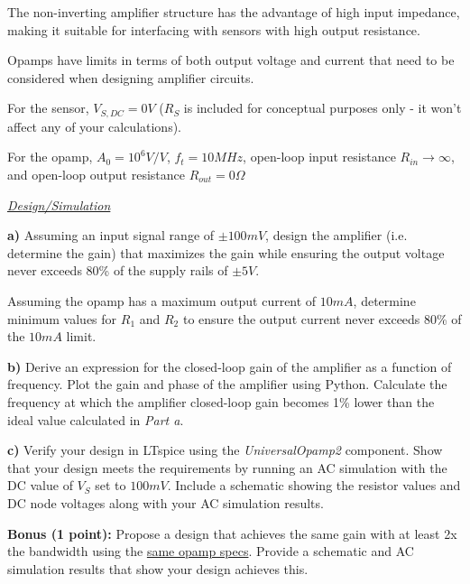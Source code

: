 \documentclass[11pt, letterpaper]{article}
\begin{document}
The non-inverting amplifier structure has the advantage of high input impedance, making it suitable for interfacing with sensors with high output resistance.

Opamps have limits in terms of both output voltage and current that need to be considered when designing amplifier circuits.

For the sensor, $V_{S,DC} = 0V$ ($R_S$ is included for conceptual purposes only - it won't affect any of your calculations).

For the opamp, $A_0 = 10^6 V/V$, $f_t = 10MHz$, open-loop input resistance $R_{in} \rightarrow \infty$, and open-loop output resistance $R_{out} = 0\Omega$

\underline{\textit{Design/Simulation}}

\textbf{a)} Assuming an input signal range of $\pm 100mV$, design the amplifier (i.e. determine the gain) that maximizes the gain while ensuring the output voltage never exceeds 80\% of the supply rails of $\pm 5V$.

Assuming the opamp has a maximum output current of $10mA$, determine minimum values for $R_1$ and $R_2$ to ensure the output current never exceeds 80\% of the $10mA$ limit.

\textbf{b)} Derive an expression for the closed-loop gain of the amplifier as a function of frequency. Plot the gain and phase of the amplifier using Python. Calculate the frequency at which the amplifier closed-loop gain becomes 1\% lower than the ideal value calculated in \textit{Part a}.

\textbf{c)} Verify your design in LTspice using the \textit{UniversalOpamp2} component. Show that your design meets the requirements by running an AC simulation with the DC value of $V_S$ set to $100mV$. Include a schematic showing the resistor values and DC node voltages along with your AC simulation results.

\textbf{Bonus (1 point):} Propose a design that achieves the same gain with at least 2x the bandwidth using the \underline{same opamp specs}. Provide a schematic and AC simulation results that show your design achieves this.
\end{document}
